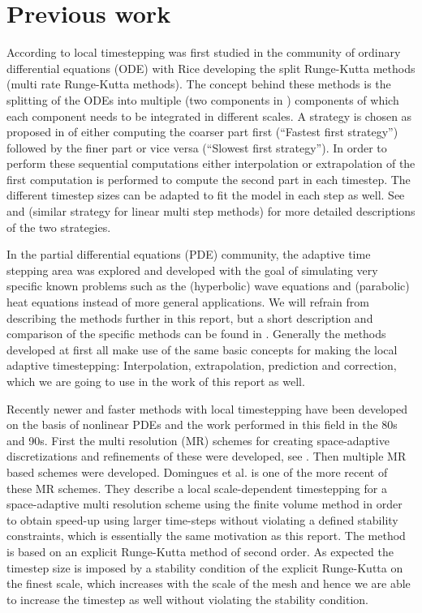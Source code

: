 \documentclass[11pt]{article}
\begin{document}

\section{Previous work} According to \cite{Gander:2013} local timestepping
was first studied in the community of ordinary differential equations (ODE)
with Rice \cite{rice:1960} developing the split Runge-Kutta methods (multi
rate Runge-Kutta methods). The concept behind these methods is the splitting
of the ODEs into multiple (two components in \cite{rice:1960}) components of
which each component needs to be integrated in different scales. A strategy
is chosen as proposed in \cite{Kvaernoe:1999} of either computing the coarser
part first (``Fastest first strategy'') followed by the finer part or vice
versa (``Slowest first strategy''). In order to perform these sequential
computations either interpolation or extrapolation of the first computation
is performed to compute the second part in each timestep. The different
timestep sizes can be adapted to fit the model in each step as well. See
\cite{Kvaernoe:1999} and \cite{Gear:1984} (similar strategy for linear multi
step methods) for more detailed descriptions of the two strategies.

In the partial differential equations (PDE) community, the adaptive time
stepping area was explored and developed with the goal of simulating
very specific known problems such as the (hyperbolic) wave equations
and (parabolic) heat equations instead of more general applications. We
will refrain from describing the methods further in this report, but a
short description and comparison of the specific methods can be found in
\cite{Gander:2013}. Generally the methods developed at first all make use
of the same basic concepts for making the local adaptive timestepping:
Interpolation, extrapolation, prediction and correction, which we are going to
use in the work of this report as well.

Recently newer and faster methods with local timestepping have been developed
on the basis of nonlinear PDEs and the work performed in this field in
the 80s and 90s. First the multi resolution (MR) schemes for creating
space-adaptive discretizations and refinements of these were developed, see
\cite{Berger:1984}. Then multiple MR based schemes were developed. Domingues
et al. \cite{Domingues:2008} is one of the more recent of these MR schemes.
They describe a local scale-dependent timestepping for a space-adaptive multi
resolution scheme using the finite volume method in order to obtain speed-up
using larger time-steps without violating a defined stability constraints,
which is essentially the same motivation as this report. The method is based
on an explicit Runge-Kutta method of second order. As expected the timestep
size is imposed by a stability condition of the explicit Runge-Kutta on the
finest scale, which increases with the scale of the mesh and hence we are able
to increase the timestep as well without violating the stability condition.
\end{document}
